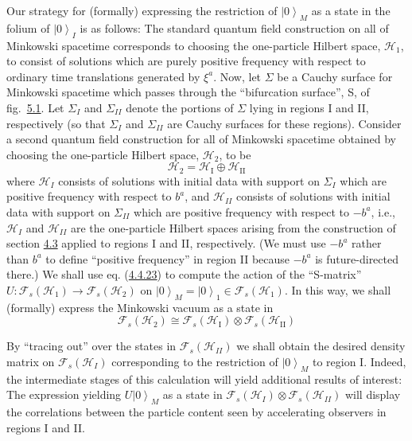 \documentclass[11pt,a4paper]{article}
\providecommand{\ket}[1]{\left\lvert#1\right\rangle}
\begin{document}
Our strategy for (formally) expressing the restriction of \(\ket{0}_M\) as a state in the folium of \(\ket{0}_I\) is as follows: The standard quantum field construction on all of Minkowski spacetime corresponds to choosing the one-particle Hilbert space, \(\mathcal H_1\), to consist of solutions which are purely positive frequency with respect to ordinary time translations generated by \(\xi^a\). Now, let \(\Sigma\) be a Cauchy surface for Minkowski spacetime which passes through the ``bifurcation surface'', S, of fig.~\hyperref[fig:5.1]{5.1}. Let \(\Sigma_I\) and \(\Sigma_{II}\) denote the portions of \(\Sigma\) lying in regions I and II, respectively (so that \(\Sigma_I\) and \(\Sigma_{II}\) are Cauchy surfaces for these regions). Consider a second quantum field construction for all of Minkowski spacetime obtained by choosing the one-particle Hilbert space, \(\mathcal H_2\), to be
\begin{equation*}
\mathcal{H}_2=\mathcal{H}_{\mathrm{I}}\oplus\mathcal{H}_{\mathrm{II}}\tag{5.1.2}\label{eq:5.1.2}
\end{equation*}
where \(\mathcal{H}_I\) consists of solutions with initial data with support on \(\Sigma_I\) which are positive frequency with respect to \(b^a\), and \(\mathcal{H}_{II}\) consists of solutions with initial data with support on \(\Sigma_{II}\) which are positive frequency with respect to \(-b^a\), i.e., \(\mathcal{H}_I\) and \(\mathcal{H}_{II}\) are the one-particle Hilbert spaces arising from the construction of section \hyperlink{sec:4.3}{4.3} applied to regions I and II, respectively. (We must use \(-b^a\) rather than \(b^a\) to define ``positive frequency'' in region II because \(-b^a\) is future-directed there.) We shall use eq. (\hyperref[eq:4.4.23]{4.4.23}) to compute the action of the ``S-matrix'' \(U:\mathcal{F}_s(\mathcal{H}_1)\to\mathcal{F}_s(\mathcal{H}_2)\) on \(\ket{0}_M=\ket{0}_1\in\mathcal{F}_s(\mathcal{H}_1)\). In this way, we shall (formally) express the Minkowski vacuum as a state in
\begin{equation*}
\mathcal{F}_s(\mathcal{H}_2)\cong\mathcal{F}_s(\mathcal{H}_{\mathrm{I}})\otimes\mathcal{F}_s(\mathcal{H}_{\mathrm{II}})\tag{5.1.3}\label{eq:5.1.3}
\end{equation*}

\hypertarget{source-122}{}

By ``tracing out'' over the states in \(\mathcal{F}_s(\mathcal{H}_{II})\) we shall obtain the desired density matrix on \(\mathcal{F}_s(\mathcal{H}_{I})\) corresponding to the restriction of \(\ket{0}_M\) to region I. Indeed, the intermediate stages of this calculation will yield additional results of interest: The expression yielding \(U\ket0_M\) as a state in \(\mathcal{F}_s(\mathcal{H}_I)\otimes\mathcal{F}_s(\mathcal{H}_{II})\) will display the correlations between the particle content seen by accelerating observers in regions I and II.
\end{document}

